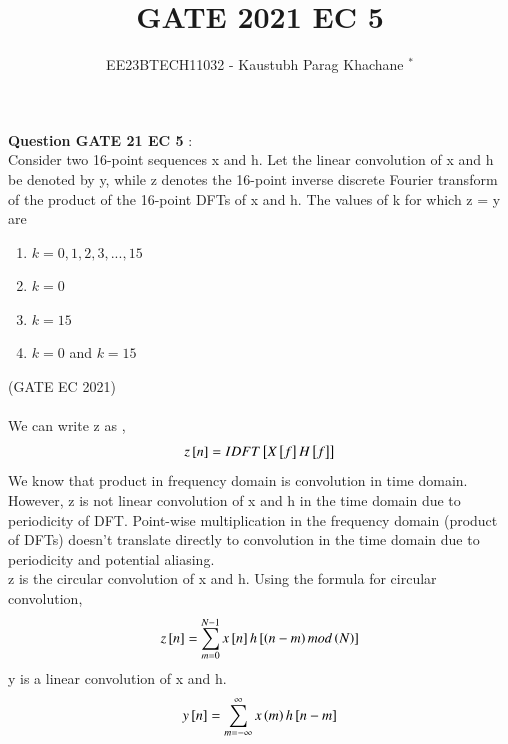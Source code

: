 \documentclass[journal,12pt,twocolumn]{IEEEtran}
\theoremstyle{remark}
\begin{document}

\vspace{3cm}

\Large\title{GATE 2021 EC 5}
\large\author{EE23BTECH11032 - Kaustubh Parag Khachane $^{*}$%
}
\maketitle
\newpage
\bigskip

\renewcommand{\thefigure}{\theenumi}
\renewcommand{\thetable}{\theenumi}
\large\textbf{Question GATE 21 EC 5} :\\
Consider two 16-point sequences x and h. Let the linear convolution of x and h be denoted by y, while z denotes the 16-point inverse discrete Fourier transform  of the product of the 16-point DFTs of x and h. The values of k for which z = y are 
\begin{enumerate}
    \item $k = 0, 1, 2, 3, ... , 15$
    \item $k = 0$
    \item $k = 15$
    \item $k = 0$ and $k = 15$
\end{enumerate}
\hfill(GATE EC 2021)\\
\solution\\

We can write z as ,
\begin{align}
    z{}\left[n\right] = IDFT{}\left[X{}\left[f\right]H{}\left[f\right]\right]
\end{align}
We know that product in frequency domain is convolution in time domain. However, z is not linear convolution of x and h in the time domain due to periodicity of DFT. Point-wise multiplication in the frequency domain (product of DFTs) doesn't translate directly to convolution in the time domain due to periodicity and potential aliasing.\\
z is the circular convolution of x and h. Using the formula for circular convolution,
\begin{align}
    z{}\left[n\right] = \sum_{m = 0}^{N-1} x{}\left[n\right] h{}\left[ \left(n - m\right)mod\left(N\right)\right]
\end{align}
y is a linear convolution of x and h.
\begin{align}
    y{}\left[n\right] = \sum_{m = -\infty}^{\infty} x\left(m\right) h{}\left[n-m\right]
\end{align}
\end{document}
